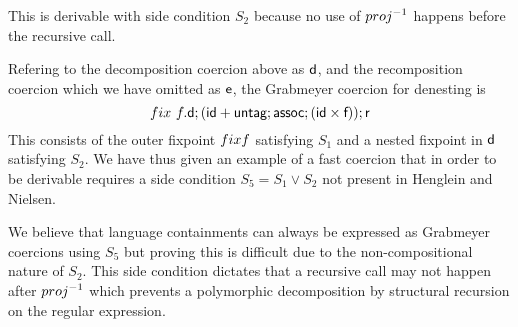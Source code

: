 \documentclass[a4paper,UKenglish,cleveref, autoref, thm-restate]{lipics-v2021}
\begin{document}
This is derivable with side condition $S_2$ because no use of $\dslcominv{proj}$ happens before the recursive call.
\begin{remark}
Refering to the decomposition coercion above as $\textsf{d}$, and the recomposition coercion which we have omitted as $\textsf{e}$, the Grabmeyer coercion for denesting is
\[ \fix~f. \dslcom{d}; (\dslcom{id} + \dslcom{untag} ; \dslcom{assoc} ; (\dslcom{id} \times \dslcom{f})) ;\dslcom{r} \]
This consists of the outer fixpoint $\fix f$ satisfying $S_1$ and a nested fixpoint in $\textsf{d}$ satisfying $S_2$. We have thus given an example of a fast coercion that in order to be derivable requires a side condition $S_5 = S_1 \lor S_2$ not present in Henglein and Nielsen.

We believe that language containments can always be expressed as Grabmeyer coercions using $S_5$ but proving this is difficult due to the non-compositional nature of $S_2$. This side condition dictates that a recursive call may not happen after $\dslcominv{proj}$ which prevents a polymorphic decomposition by structural recursion on the regular expression.
\end{remark}
\end{document}

